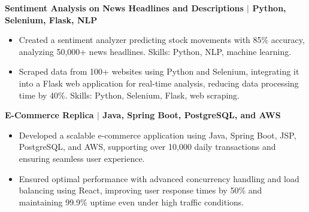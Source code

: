 \documentclass{article}
\begin{document}
\noindent \textbf{Sentiment Analysis on News Headlines and Descriptions $\mid$ Python, Selenium, Flask, NLP}
\begin{itemize}[noitemsep,nolistsep,leftmargin=*]
\item Created a sentiment analyzer predicting stock movements with 85\% accuracy, analyzing 50,000+ news headlines. Skills: Python, NLP, machine learning.
\item Scraped data from 100+ websites using Python and Selenium, integrating it into a Flask web application for real-time analysis, reducing data processing time by 40\%. Skills: Python, Selenium, Flask, web scraping.
\end{itemize}
\vspace{1mm}

\noindent \textbf{E-Commerce Replica $\mid$ Java, Spring Boot, PostgreSQL, and AWS}
\begin{itemize}[noitemsep,nolistsep,leftmargin=*]
\item Developed a scalable e-commerce application using Java, Spring Boot, JSP, PostgreSQL, and AWS, supporting over 10,000 daily transactions and ensuring seamless user experience.
\item Ensured optimal performance with advanced concurrency handling and load balancing using React, improving user response times by 50\% and maintaining 99.9\% uptime even under high traffic conditions.
\end{itemize}
\end{document}
